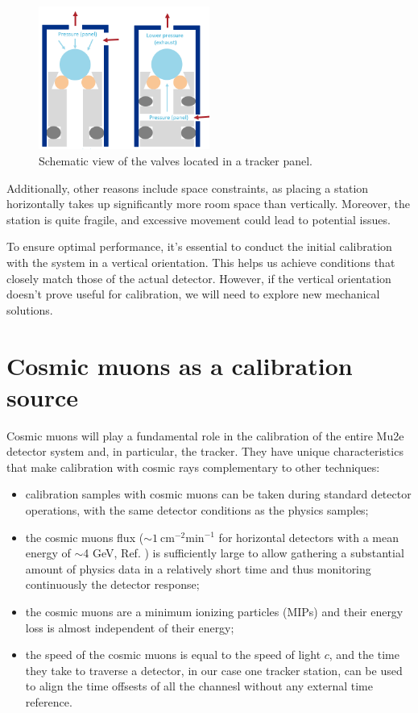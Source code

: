 \begin{figure}[!h]
    \centering
    \includegraphics[width =0.5\textwidth]{figures/png/gassystem.png}
    \caption[Schematic view of the valves located in a tracker panel.]{Schematic view of the valves located in a tracker panel.}
    \label{fig:gassytem}
\end{figure}
Additionally, other reasons include space constraints, as placing 
a station horizontally takes up significantly more room space than 
vertically. Moreover, the station is quite fragile, and 
excessive movement could lead to potential issues.

To ensure optimal performance, it's essential to 
conduct the initial calibration with the system in a vertical orientation. 
This helps us achieve conditions that closely 
match those of the actual detector. However, if the vertical 
orientation doesn't prove useful for calibration, 
we will need to explore new mechanical solutions.

\section{Cosmic muons as a calibration source}
Cosmic muons will play a fundamental role in the 
calibration of the entire Mu2e detector system and, 
in particular, the tracker. They have unique 
characteristics that make calibration with cosmic rays 
complementary to other techniques:

 

\begin{itemize}
    \item calibration samples with cosmic muons 
    can be taken during standard detector operations, 
    with the same detector conditions as the physics samples;
    \item the cosmic muons flux 
    ($\sim 1 \ \text{cm}^{-2} \text{min}^{-1}$ 
    for horizontal detectors with a mean
    energy of $\sim$4 GeV, Ref. \cite{muonflux}) is sufficiently 
    large to allow gathering a substantial amount of 
    physics data in a relatively short time and 
    thus monitoring continuously the detector response;
    \item the cosmic muons are a minimum ionizing particles (MIPs) and 
    their energy loss is almost 
    independent of their energy;
    \item the speed of the cosmic muons is equal to the 
    speed of light $c$, and the time they take to traverse 
    a detector, in our case one tracker station, can be 
    used to align the time offsests of all the channesl 
    without any external time reference.
\end{itemize}
